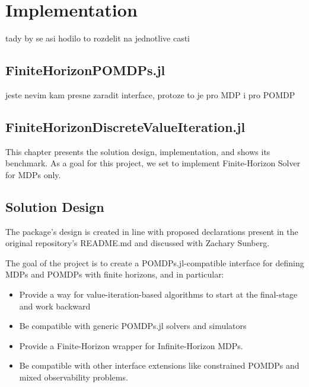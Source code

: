 \chapter{Implementation}


tady by se asi hodilo to rozdelit na jednotlive casti

\section{FiniteHorizonPOMDPs.jl}

jeste nevim kam presne zaradit interface, protoze to je pro MDP i pro POMDP

\section{FiniteHorizonDiscreteValueIteration.jl}






This chapter presents the solution design, implementation, and shows its benchmark.
As a goal for this project, we set to implement Finite-Horizon Solver for MDPs only.

\section{Solution Design}
The package's design is created in line with proposed declarations present in the original repository's README.md and discussed with Zachary Sunberg.

The goal of the project is to create a POMDPs.jl-compatible interface for defining MDPs and POMDPs with finite horizons, and in particular:
\begin{itemize}
    \item Provide a way for value-iteration-based algorithms to start at the final-stage and work backward
    \item Be compatible with generic POMDPs.jl solvers and simulators
    \item Provide a Finite-Horizon wrapper for Infinite-Horizon MDPs.
    \item Be compatible with other interface extensions like constrained POMDPs and mixed observability problems.
\end{itemize}

